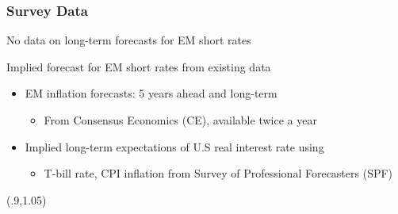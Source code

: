 \documentclass[12pt, aspectratio=169, xcolor=dvipsnames]{beamer}
\begin{document}



\begin{frame}[label=SCBP]
\frametitle{Survey Data}

No data on long-term forecasts for EM short rates

Implied forecast for EM short rates from existing data %



\begin{itemize}
\item \alert{EM inflation} forecasts: 5 years ahead and long-term
\begin{itemize}
	\item From Consensus Economics (CE), available twice a year
\end{itemize}

\item Implied long-term expectations of \alert{U.S real interest rate} using
\begin{itemize}
\item T-bill rate, CPI inflation from Survey of Professional Forecasters (SPF)
\end{itemize}
\end{itemize}

\begin{textblock*}{3cm}(.9\textwidth,1.05\textheight)
	\hyperlink{YldCBP}{}
\end{textblock*}
\end{frame}
\end{document}
